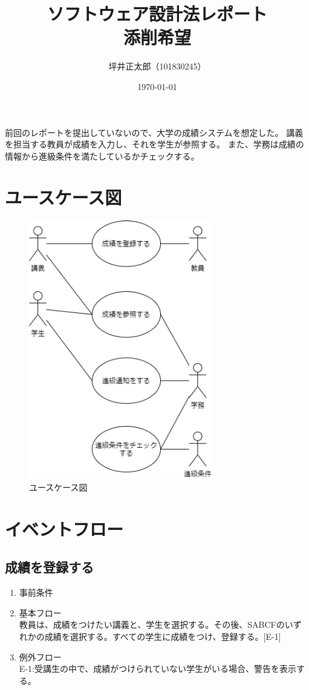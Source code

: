 \documentclass[a4paper,10pt]{jsarticle}
\begin{document}
\title{ソフトウェア設計法レポート\\添削希望}
\author{坪井正太郎（101830245）}
\date{\today}
\maketitle
前回のレポートを提出していないので、大学の成績システムを想定した。
講義を担当する教員が成績を入力し、それを学生が参照する。
また、学務は成績の情報から進級条件を満たしているかチェックする。

\section{ユースケース図}

\begin{figure}[H]
  \centering
  \includegraphics[width=8cm]{./01.drawio.png}
  \caption{ユースケース図}
  \label{ユースケース図}
\end{figure}

\section{イベントフロー}
\subsection{成績を登録する}
\begin{enumerate}
  \item 事前条件
  \item 基本フロー\\
        教員は、成績をつけたい講義と、学生を選択する。その後、SABCFのいずれかの成績を選択する。すべての学生に成績をつけ、登録する。[E-1]
  \item 例外フロー\\
        E-1:受講生の中で、成績がつけられていない学生がいる場合、警告を表示する。
\end{enumerate}
\end{document}
